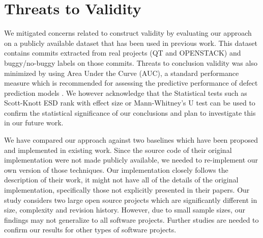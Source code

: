 \section{Threats to Validity}
\label{sec:threat}
We mitigated concerns related to construct validity  by evaluating our approach on a publicly available dataset that has been used in previous work. This dataset contains commits extracted from real projects (QT and OPENSTACK) and buggy/no-buggy labels on those commits. Threats to conclusion validity was also minimized by using Area Under the Curve (AUC), a standard performance measure which is recommended for assessing the predictive performance of defect prediction models \cite{tantithamthavorn2018optimization}. We however acknowledge that the Statistical tests such as Scott-Knott ESD rank with effect size or Mann-Whitney's U test can be used to confirm the statistical significance of our conclusions and plan to investigate this in our future work.

We have compared our approach against two baselines which have been proposed and implemented in existing work. Since the source code of their original implementation were not made publicly available, we needed to re-implement our own version of those techniques. Our implementation closely follows the description of their work, it might not have all of the details of the original implementation, specifically those not explicitly presented in their papers. Our study considers two large open source projects which are significantly different in size, complexity and revision history. However, due to small sample sizes, our findings may not generalize to all software projects. Further studies are needed to confirm our results for other types of software projects.